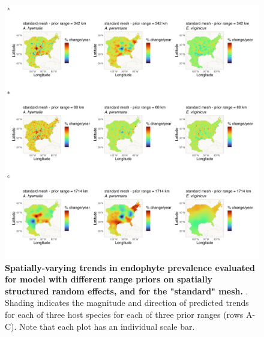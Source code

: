 \documentclass[11pt]{article}
\newcommand{\firstrevise}[1]{{\color{black}{#1}}}
\begin{document}
\begin{figure}[H]
	\centering
	\includegraphics[width = .8\linewidth]{../Plots/standard_mesh_comparison_svc_plot.png}
	\caption[Spatially-varying trends in endophyte prevalence evaluated for models with different range priors on spatially structured random effects, and for the "standard" mesh]{\textbf{Spatially-varying trends in endophyte prevalence evaluated for \firstrevise{the endophyte prevalence} model with different range priors on spatially structured random effects, and for the "standard" mesh.} \firstrevise{Data used in model fitting is the same across all panels and as in the main text}. Shading indicates the magnitude and direction of predicted trends for each of three host species for each of three prior ranges (rows A-C). Note that each plot has an individual scale bar.}
	\label{fig:standard_comparison_svc_plot}
\end{figure}
\end{document}
